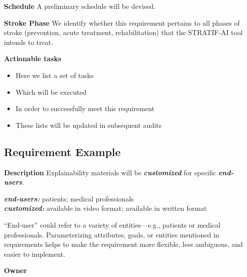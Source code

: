 \documentclass[
  letterpaper,
  DIV=11,
  numbers=noendperiod]{scrreport}
\providecommand{\tightlist}{%
  \setlength{\itemsep}{0pt}\setlength{\parskip}{0pt}}\usepackage{longtable,booktabs,array}
\begin{document}
\textbf{Schedule} A preliminary schedule will be devised.

\textbf{Stroke Phase} We identify whether this requirement pertains to
all phases of stroke (prevention, acute treatment, rehabilitation) that
the STRATIF-AI tool intends to treat.

\textbf{Actionable tasks}

\begin{itemize}
\tightlist
\item
  Here we list a set of tasks
\item
  Which will be executed
\item
  In order to successfully meet this requirement
\item
  These lists will be updated in subsequent audits
\end{itemize}

\hypertarget{requirement-example}{%
\subsection*{Requirement Example}\label{requirement-example}}

\textbf{Description} Explainability materials will be
\textbf{\emph{customized}} for specific \textbf{\emph{end-users}}.

\textbf{\emph{end-users:}} patients; medical professionals\\
\textbf{\emph{customized:}} available in video format; available in
written format

\begin{tcolorbox}[enhanced jigsaw, arc=.35mm, breakable, coltitle=black, toptitle=1mm, colbacktitle=quarto-callout-tip-color!10!white, toprule=.15mm, left=2mm, bottomrule=.15mm, opacitybacktitle=0.6, titlerule=0mm, colback=white, opacityback=0, title=\textcolor{quarto-callout-tip-color}{\faLightbulb}\hspace{0.5em}{Tip}, bottomtitle=1mm, colframe=quarto-callout-tip-color-frame, leftrule=.75mm, rightrule=.15mm]

``End-user'' could refer to a variety of entities---e.g., patients or
medical professionals. Parameterizing attributes, goals, or entities
mentioned in requirements helps to make the requirement more flexible,
less ambiguous, and easier to implement.

\end{tcolorbox}

\textbf{Owner}
\end{document}

